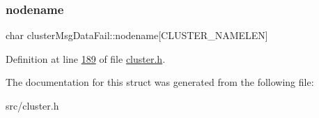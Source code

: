 \subsubsection{\texorpdfstring{nodename}{nodename}}
{\footnotesize\ttfamily char cluster\+Msg\+Data\+Fail\+::nodename\mbox{[}C\+L\+U\+S\+T\+E\+R\+\_\+\+N\+A\+M\+E\+L\+EN\mbox{]}}



Definition at line \hyperlink{cluster_8h_source_l00189}{189} of file \hyperlink{cluster_8h_source}{cluster.\+h}.



The documentation for this struct was generated from the following file\+:\begin{DoxyCompactItemize}
\item 
src/cluster.\+h\end{DoxyCompactItemize}
